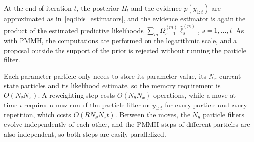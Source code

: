 At the end of iteration $t$, the posterior $\Pi_t$ and the evidence $p(y_{1:t})$ are approximated as in~\eqref{eq:ibis_estimators}, and the evidence estimator is again the product of the estimated predictive likelihoods $\sum_m\Omega_{s-1}^{(m)}\hat{\ell}_s^{(m)}$, $s=1,\ldots,t$. As with PMMH, the computations are performed on the logarithmic scale, and a proposal outside the support of the prior is rejected without running the particle filter.

Each parameter particle only needs to store its parameter value, its $N_x$ current state particles and its likelihood estimate, so the memory requirement is $O(N_\theta N_x)$. A reweighting step costs $O(N_\theta N_x)$ operations, while a move at time $t$ requires a new run of the particle filter on $y_{1:t}$ for every particle and every repetition, which costs $O(RN_\theta N_xt)$. Between the moves, the $N_\theta$ particle filters evolve independently of each other, and the PMMH steps of different particles are also independent, so both steps are easily parallelized.

